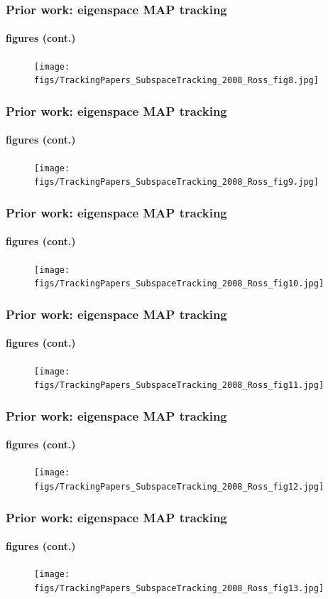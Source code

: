 \begin{frame}
\frametitle{Prior work: eigenspace MAP tracking}
\framesubtitle{figures (cont.)}
\logoCSIPCPL\mypagenum
	\begin{figure}
		\texttt{[image: figs/TrackingPapers\_SubspaceTracking\_2008\_Ross\_fig8.jpg]}
	\end{figure}
\end{frame}



\begin{frame}
\frametitle{Prior work: eigenspace MAP tracking}
\framesubtitle{figures (cont.)}
\logoCSIPCPL\mypagenum
	\begin{figure}
		\texttt{[image: figs/TrackingPapers\_SubspaceTracking\_2008\_Ross\_fig9.jpg]}
	\end{figure}
\end{frame}



\begin{frame}
\frametitle{Prior work: eigenspace MAP tracking}
\framesubtitle{figures (cont.)}
\logoCSIPCPL\mypagenum
	\begin{figure}
		\texttt{[image: figs/TrackingPapers\_SubspaceTracking\_2008\_Ross\_fig10.jpg]}
	\end{figure}
\end{frame}


\begin{frame}
\frametitle{Prior work: eigenspace MAP tracking}
\framesubtitle{figures (cont.)}
\logoCSIPCPL\mypagenum
	\begin{figure}
		\texttt{[image: figs/TrackingPapers\_SubspaceTracking\_2008\_Ross\_fig11.jpg]}
	\end{figure}
\end{frame}


\begin{frame}
\frametitle{Prior work: eigenspace MAP tracking}
\framesubtitle{figures (cont.)}
\logoCSIPCPL\mypagenum
	\begin{figure}
		\texttt{[image: figs/TrackingPapers\_SubspaceTracking\_2008\_Ross\_fig12.jpg]}
	\end{figure}
\end{frame}


\begin{frame}
\frametitle{Prior work: eigenspace MAP tracking}
\framesubtitle{figures (cont.)}
\logoCSIPCPL\mypagenum
	\begin{figure}
		\texttt{[image: figs/TrackingPapers\_SubspaceTracking\_2008\_Ross\_fig13.jpg]}
	\end{figure}
\end{frame}

